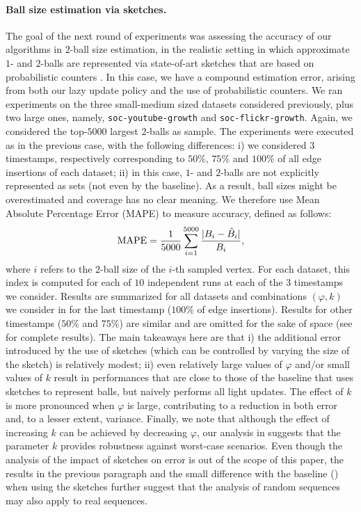\paragraph{Ball size estimation via sketches.} 
The goal of the next round of experiments was assessing the accuracy of our algorithms in $2$-ball size estimation, in the realistic setting in which approximate $1$- and $2$-balls are represented via state-of-art sketches that are based on probabilistic counters \cite{trevisan/646978.711822}. In this case, we have a compound estimation error, arising from both our lazy update policy and the use of probabilistic counters. We ran experiments on the three small-medium sized datasets considered previously, plus two large ones, namely, \texttt{soc-youtube-growth} and \texttt{soc-flickr-growth}. Again, we considered the top-$5000$ largest $2$-balls as sample. The experiments were executed as in the previous case, with the following differences: i) we considered $3$ timestamps, respectively corresponding to $50\%$, $75\%$ and $100\%$ of all edge insertions of each dataset; ii) in this case, $1$- and $2$-balls are not explicitly represented as sets (not even by the baseline). As a result, ball sizes might be overestimated and coverage has no clear meaning.
We therefore use Mean Absolute Percentage Error (MAPE) to measure accuracy,  defined as follows:
\[
\text{MAPE} = \frac{1}{5000} \sum_{i=1}^{5000} \frac{\vert B_i - \hat{B}_i \vert}{B_i},
\]
where $i$ refers to the $2$-ball size of the $i$-th sampled vertex. For each dataset, this index is computed for each of $10$ independent runs at each of the $3$ timestamps we consider.
Results are summarized for all datasets and combinations $(\varphi, k)$ we consider in  for the last timestamp ($100\%$ of edge insertions). Results for other timestamps ($50\%$ and $75\%$) are similar and are omitted for the sake of space (see  for complete results). The main takeaways here are that i) the additional error introduced by the use of sketches (which can be controlled by varying the size of the sketch) is relatively modest; ii) even relatively large values of $\varphi$ and/or small values of $k$ result in performances that are close to those of the baseline that uses sketches to represent balls, but naively performs all light updates. The effect of $k$ is more pronounced when $\varphi$ is large, contributing to a reduction in both error and, to a lesser extent, variance.
Finally, we note that although the effect of increasing $k$ can be achieved by decreasing $\varphi$, our analysis in  suggests that the parameter $k$ provides robustness against worst-case scenarios.
Even though the analysis of the impact of sketches on error is out of the scope of this paper, the results in the previous paragraph and the small difference with the baseline () when using the sketches further suggest that the analysis of random sequences may also apply to real sequences.

